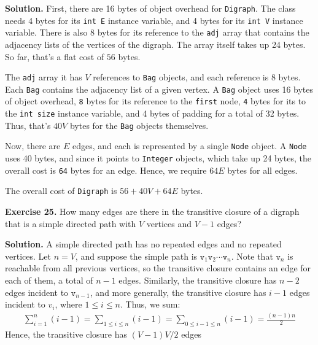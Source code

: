 \documentclass[12pt, a4paper]{article}
\newenvironment{ex}[2][Exercise]
{\par\medskip\noindent \textbf{#1 #2.}}
{\medskip}
\newenvironment{sol}[1][Solution]
{\par\medskip\noindent \textbf{#1.} }
{\medskip}
\begin{document}
	\begin{sol}
		First, there are 16 bytes of object overhead for \texttt{Digraph}. The class
		needs 4 bytes for its \texttt{int E} instance variable, and 4 bytes for its
		\texttt{int V} instance variable. There is also 8 bytes for its reference
		to the \texttt{adj} array that contains the adjacency lists of the vertices
		of the digraph. The array itself takes up 24 bytes. So far, that's a flat
		cost of $56$ bytes.
		
		The \texttt{adj} array it has $V$ references to \texttt{Bag} objects, and
		each reference is $8$ bytes. Each \texttt{Bag}
		contains the adjacency list of a given vertex. A \texttt{Bag} object uses
		16 bytes of object overhead, \texttt{8} bytes for its reference to the
		\texttt{first} node, \texttt{4} bytes for its to the \texttt{int size}
		instance variable, and 4 bytes of padding for a total of 32 bytes.
		Thus, that's $40V$ bytes for the \texttt{Bag} objects themselves.
		
		Now, there are $E$ edges, and each is represented by a single \texttt{Node}
		object. A \texttt{Node} uses 40 bytes, and since it points to \texttt{Integer}
		objects, which take up 24 bytes, the overall cost is \texttt{64} bytes
		for an edge. Hence, we require $64E$ bytes for all edges.
		
		The overall cost of \texttt{Digraph} is $56+40V+64E$ bytes.
	\end{sol}
	\begin{ex}{25}
		How many edges are there in the transitive closure of a digraph that
		is a simple directed path with $V$ vertices and $V-1$ edges?
	\end{ex}
	\begin{sol}
		A simple directed path has no repeated edges and no repeated vertices.
		Let $n=V$, and suppose the simple path is $\texttt{v}_1\texttt{v}_2\cdots\texttt{v}_n$.
		Note that $\texttt{v}_n$ is reachable from all previous vertices, so
		the transitive closure contains an edge for each of them, a total of
		$n-1$ edges. Similarly, the transitive closure has $n-2$ edges incident to
		$\texttt{v}_{n-1}$, and more generally, the transitive closure has
		$i-1$ edges incident to $v_i$, where $1\leq i\leq n$. Thus, we sum:
		\begin{align*}
			\sum_{i=1}^{n}(i-1)=\sum_{1\leq i\leq n}(i-1)=\sum_{0\leq i-1\leq n}(i-1)=\frac{(n-1)n}{2}
		\end{align*}
		Hence, the transitive closure has $(V-1)V/2$ edges
	\end{sol}
	
	\pagebreak
	\printbibliography
\end{document}
